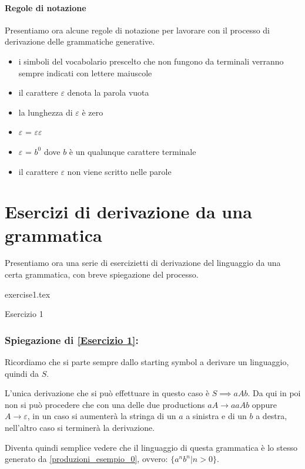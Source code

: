 \documentclass[class=book, crop=false, oneside, 12pt]{standalone}
\begin{document}
\paragraph{Regole di notazione}
Presentiamo ora alcune regole di notazione per lavorare con il processo di derivazione delle grammatiche generative.
\begin{itemize}
    \item i simboli del vocabolario prescelto che non fungono da terminali verranno sempre indicati con lettere maiuscole
    \item il carattere $\varepsilon$ denota la parola vuota
    \item la lunghezza di $\varepsilon$ è zero
    \item $\varepsilon$ = $\varepsilon$$\varepsilon$
    \item $\varepsilon$ =  $b^0$ dove $b$ è un qualunque carattere terminale
    \item il carattere $\varepsilon$ non viene scritto nelle parole
\end{itemize}

\section{Esercizi di derivazione da una grammatica}
Presentiamo ora una serie di esercizietti di derivazione del linguaggio da una certa grammatica, con breve spiegazione del processo.

\begin{table}[H]
	\centering
	{exercise1.tex}
    \caption{Esercizio 1}
    \label{Esercizio 1}
\end{table}
\subsubsection*{Spiegazione di \ref{Esercizio 1}:}
Ricordiamo che si parte sempre dallo starting symbol a derivare un linguaggio, quindi da $S$.

L'unica derivazione che si può effettuare in questo caso è $S \implies aAb$.
Da qui in poi non si può procedere che con una delle due productions $aA \to aaAb$ oppure $A \to \varepsilon$, in un caso si aumenterà la stringa di un $a$ a sinistra e di un $b$ a destra, nell'altro caso si terminerà la derivazione.

Diventa quindi semplice vedere che il linguaggio di questa grammatica è lo stesso generato da \ref{produzioni_esempio_0}, ovvero: $\{a^n b^n |n>0\}$.
\end{document}
